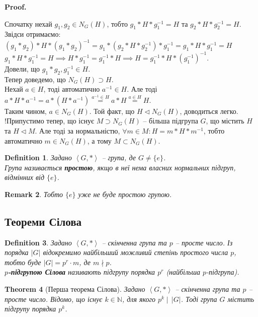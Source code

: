 \documentclass[a4paper, 10pt]{article}
\makeatletter
\theoremstyle{theoremdd}
\newtheorem{theorem}{Theorem}[subsection]
\theoremstyle{theoremdd}
\newtheorem{definition}[theorem]{Definition}
\theoremstyle{theoremdd}
\theoremstyle{theoremdd}
\theoremstyle{theoremdd}
\theoremstyle{theoremdd}
\theoremstyle{theoremdd}
\theoremstyle{theoremdd}
\theoremstyle{theoremdd}
\theoremstyle{theoremdd}
\theoremstyle{theoremdd}
\newtheorem{remark}[theorem]{Remark}
\theoremstyle{theoremdd}
\theoremstyle{theoremdd}
\theoremstyle{theoremdd}
\theoremstyle{theoremdd}
\renewenvironment{proof}[1][Proof.\\]{\par
\pushQED{\hfill \qed}%
\normalfont \topsep6\p@\@plus6\p@\relax
\trivlist
\item\relax
{\bfseries
#1\@addpunct{.}}\hspace\labelsep\ignorespaces
}{%
\popQED\endtrivlist\@endpefalse
}
\makeatother
\begin{document}
\begin{proof}
Спочатку нехай $g_1,g_2 \in N_G(H)$, тобто $g_1*H*g_1^{-1} = H$ та $g_2*H*g_2^{-1} = H$. Звідси отримаємо:\\
$(g_1*g_2)*H*(g_1*g_2)^{-1} = g_1*(g_2*H*g_2^{-1})*g_1^{-1} = g_1*H*g_1^{-1} = H$\\
$g_1*H*g_1^{-1} = H \implies H*g_1^{-1} = g_1^{-1}*H \implies H = g_1^{-1}*H*(g_1^{-1})^{-1}$.\\
Довели, що $g_1*g_2, g_1^{-1} \in H$.\\
Тепер доведемо, що $N_G(H) \supset H$.\\
Нехай $a \in H$, тоді автоматично $a^{-1} \in H$. Але тоді\\
$a*H*a^{-1} = a*(H*a^{-1}) \overset{a^{-1} \in H}{=} a*H \overset{a \in H}{=} H$.\\
Таким чином, $a \in N_G(H)$. Той факт, що $H \triangleleft N_G(H)$, доводиться легко.\\
!Припустимо тепер, що існує $M \supset N_G(H)$ -- більша підгрупа $G$, що містить $H$ та $H \triangleleft M$. Але тоді за нормальністю, $\forall m \in M: H = m*H*m^{-1}$, тобто автоматично $m \in N_G(H)$, а тому $M \subset N_G(H)$.
\end{proof}

\begin{definition}
Задано $\left< G, *\right>$ -- група, де $G \neq \{e\}$.\\
Група називається \textbf{простою}, якщо в неї нема власних нормальних підгруп, відмінних від $\{e\}$.
\end{definition}

\begin{remark}
Тобто $\{e\}$ уже не буде простою групою.
\end{remark}

\subsection{Теореми Сілова}
\begin{definition}
Задано $\left< G, * \right>$ -- скінченна група та $p$ -- просте число. Із порядка $|G|$ відокремимо найбільший можливий степінь простого числа $p$, тобто буде $|G| = p^r \cdot m$, де $m \nmid p$.\\
\textbf{$p$-підгрупою Сілова} називають підгрупу порядка $p^r$ (найбільша $p$-підгрупа).
\end{definition}

\begin{theorem}[Перша теорема Сілова]
Задано $\left< G, * \right>$ -- скінченна група та $p$ -- просте число. Відомо, що існує $k \in \mathbb{N}$, для якого $p^k \mid \, |G|$. Тоді група $G$ містить підгрупу порядка $p^k$.
\end{theorem}
\end{document}
